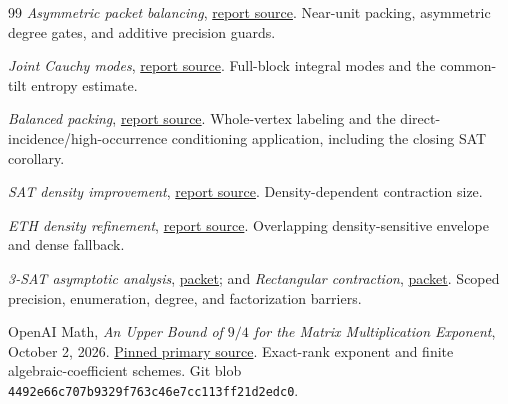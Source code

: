\begin{thebibliography}{99}
\emph{Asymmetric packet balancing},
\href{https://github.com/VladimirReshetnikov/ProveIt/blob/8e76d515063c4b9fbd8743a846b457e3a01bc039/Computability/SubexponentialSAT/Research/eth_asymmetric_packet_balancing/report.tex}{report source}.
Near-unit packing, asymmetric degree gates, and additive precision guards.

\emph{Joint Cauchy modes},
\href{https://github.com/VladimirReshetnikov/ProveIt/blob/8e76d515063c4b9fbd8743a846b457e3a01bc039/Computability/SubexponentialSAT/Research/eth_joint_cauchy/report.tex}{report source}.
Full-block integral modes and the common-tilt entropy estimate.

\emph{Balanced packing},
\href{https://github.com/VladimirReshetnikov/ProveIt/blob/8e76d515063c4b9fbd8743a846b457e3a01bc039/Computability/SubexponentialSAT/Research/eth_balanced_packing/report.tex}{report source}.
Whole-vertex labeling and the direct-incidence/high-occurrence
conditioning application, including the closing SAT corollary.

\emph{SAT density improvement},
\href{https://github.com/VladimirReshetnikov/ProveIt/blob/8e76d515063c4b9fbd8743a846b457e3a01bc039/Computability/SubexponentialSAT/Research/sat_density_improvement/density_aware_sat_improvement.tex}{report source}.
Density-dependent contraction size.

\emph{ETH density refinement},
\href{https://github.com/VladimirReshetnikov/ProveIt/blob/8e76d515063c4b9fbd8743a846b457e3a01bc039/Computability/SubexponentialSAT/Research/eth_density_refinement/report.tex}{report source}.
Overlapping density-sensitive envelope and dense fallback.

\emph{3-SAT asymptotic analysis},
\href{https://github.com/VladimirReshetnikov/ProveIt/tree/8e76d515063c4b9fbd8743a846b457e3a01bc039/Computability/SubexponentialSAT/Research/3sat_asymptotic_analysis}{packet};
and \emph{Rectangular contraction},
\href{https://github.com/VladimirReshetnikov/ProveIt/tree/8e76d515063c4b9fbd8743a846b457e3a01bc039/Computability/SubexponentialSAT/Research/subsat_rectangular}{packet}.
Scoped precision, enumeration, degree, and factorization barriers.

OpenAI Math, \emph{An Upper Bound of $9/4$ for the Matrix Multiplication
Exponent}, October 2, 2026.
\href{https://github.com/openai/math/blob/7ef5c0cc5ca4b0e072b7a050fca09ab24bc6fa3a/preprints/Matrix-Multiplication-Nine-Fourths-October-2-2026/build/paper.tex}{Pinned primary source}.
Exact-rank exponent and finite algebraic-coefficient schemes.
Git blob \texttt{4492e66c707b9329f763c46e7cc113ff21d2edc0}.


\end{thebibliography}
